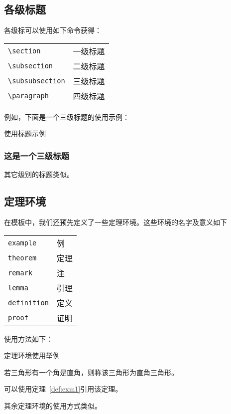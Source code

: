\subsection{各级标题}
各级标可以使用如下命令获得：
\begin{mybox}
	\begin{tabular}{p{10cm}p{5cm}}
		\verb|\section|         	& 一级标题\\
		\verb|\subsection|       	& 二级标题\\
		\verb|\subsubsection|      	& 三级标题\\
		\verb|\paragraph|        	& 四级标题\\
	\end{tabular}
\end{mybox}
\noindent 例如，下面是一个三级标题的使用示例：
\begin{myexample}{使用标题示例}
\subsubsection{这是一个三级标题}
\end{myexample}
\noindent 其它级别的标题类似。


\subsection{定理环境}
在模板中，我们还预先定义了一些定理环境。这些环境的名字及意义如下
\begin{mybox}
	\begin{tabular}{p{10cm}p{5cm}}
		\verb|example|         	& 例\\
		\verb|theorem|       	& 定理\\
		\verb|remark|      		& 注\\
		\verb|lemma|        	& 引理\\
		\verb|definition|       & 定义\\
		\verb|proof|         	& 证明\\
	\end{tabular}
\end{mybox}
\noindent 使用方法如下：
\begin{myexample}{定理环境使用举例}
\begin{definition}[直角三角形]\label{def:exm1}
    若三角形有一个角是直角，则称该三角形为直角三角形。
\end{definition}
可以使用定理~\ref{def:exm1}引用该定理。
\end{myexample}
\noindent 其余定理环境的使用方式类似。